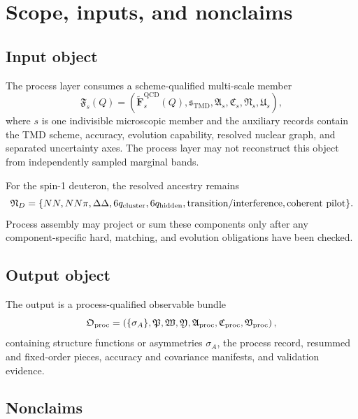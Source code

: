 \documentclass[11pt]{article}
\newcommand{\QCD}{\mathrm{QCD}}
\newcommand{\TMD}{\mathrm{TMD}}
\begin{document}
\tableofcontents
\newpage

\section{Scope, inputs, and nonclaims}
\label{sec:scope}

\subsection{Input object}

The process layer consumes a scheme-qualified multi-scale member
\begin{equation}
 \mathfrak F_s(Q)=
 \left(
 \widetilde{\bm F}^{\QCD}_s(Q),
 \mathfrak s_{\TMD},
 \mathfrak A_s,
 \mathfrak C_s,
 \mathfrak N_s,
 \mathfrak U_s
 \right),
 \label{eq:input-bundle}
\end{equation}
where \(s\) is one indivisible microscopic member and the auxiliary records contain the TMD scheme, accuracy, evolution capability, resolved nuclear graph, and separated uncertainty axes.  The process layer may not reconstruct this object from independently sampled marginal bands.

For the spin-1 deuteron, the resolved ancestry remains
\begin{equation}
 \mathfrak N_D=
 \{NN,NN\pi,\Delta\Delta,6q_{\rm cluster},6q_{\rm hidden},
 \text{transition/interference},\text{coherent pilot}\}.
 \label{eq:nuclear-ancestry}
\end{equation}
Process assembly may project or sum these components only after any component-specific hard, matching, and evolution obligations have been checked.

\subsection{Output object}

The output is a process-qualified observable bundle
\begin{equation}
 \mathfrak O_{\rm proc}=
 \left(
 \{\sigma_A\},
 \mathfrak P,
 \mathfrak W,
 \mathfrak Y,
 \mathfrak A_{\rm proc},
 \mathfrak C_{\rm proc},
 \mathfrak V_{\rm proc}
 \right),
 \label{eq:output-bundle}
\end{equation}
containing structure functions or asymmetries \(\sigma_A\), the process record, resummed and fixed-order pieces, accuracy and covariance manifests, and validation evidence.

\subsection{Nonclaims}
\end{document}
